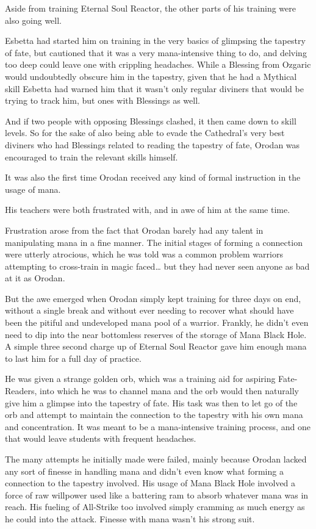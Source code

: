 \documentclass[a4paper,10pt]{book}
\begin{document}
Aside from training Eternal Soul Reactor, the other parts of his training were also going well.\par
Esbetta had started him on training in the very basics of glimpsing the tapestry of fate, but cautioned that it was a very mana-intensive thing to do, and delving too deep could leave one with crippling headaches. While a Blessing from Ozgaric would undoubtedly obscure him in the tapestry, given that he had a Mythical skill Esbetta had warned him that it wasn’t only regular diviners that would be trying to track him, but ones with Blessings as well.\par
And if two people with opposing Blessings clashed, it then came down to skill levels. So for the sake of also being able to evade the Cathedral’s very best diviners who had Blessings related to reading the tapestry of fate, Orodan was encouraged to train the relevant skills himself.\par
It was also the first time Orodan received any kind of formal instruction in the usage of mana.\par
His teachers were both frustrated with, and in awe of him at the same time.\par
Frustration arose from the fact that Orodan barely had any talent in manipulating mana in a fine manner. The initial stages of forming a connection were utterly atrocious, which he was told was a common problem warriors attempting to cross-train in magic faced… but they had never seen anyone as bad at it as Orodan.\par
But the awe emerged when Orodan simply kept training for three days on end, without a single break and without ever needing to recover what should have been the pitiful and undeveloped mana pool of a warrior. Frankly, he didn’t even need to dip into the near bottomless reserves of the storage of Mana Black Hole. A simple three second charge up of Eternal Soul Reactor gave him enough mana to last him for a full day of practice.\par
He was given a strange golden orb, which was a training aid for aspiring Fate-Readers, into which he was to channel mana and the orb would then naturally give him a glimpse into the tapestry of fate. His task was then to let go of the orb and attempt to maintain the connection to the tapestry with his own mana and concentration. It was meant to be a mana-intensive training process, and one that would leave students with frequent headaches.\par
The many attempts he initially made were failed, mainly because Orodan lacked any sort of finesse in handling mana and didn’t even know what forming a connection to the tapestry involved. His usage of Mana Black Hole involved a force of raw willpower used like a battering ram to absorb whatever mana was in reach. His fueling of All-Strike too involved simply cramming as much energy as he could into the attack. Finesse with mana wasn’t his strong suit.\par
\end{document}
